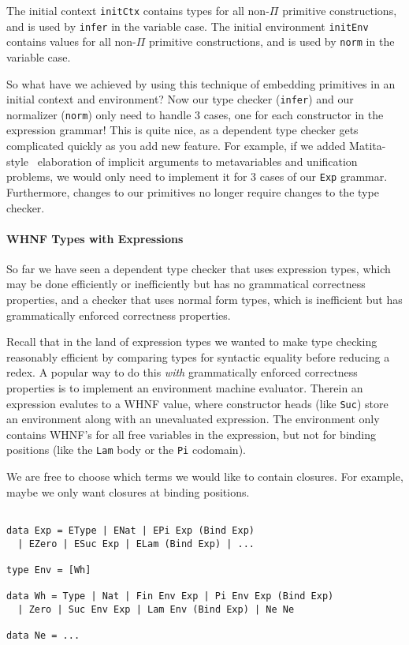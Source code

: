 \documentclass[preprint,authoryear]{sigplanconf}
\begin{document}
The initial context \texttt{initCtx} contains types for all
non-$\Pi$ primitive constructions, and is used by \texttt{infer} in the
variable case.
The initial environment \texttt{initEnv} contains values for all
non-$\Pi$ primitive constructions, and is used by \texttt{norm} in the
variable case.

So what have we achieved by using this technique of embedding primitives
in an initial context and environment? Now our type checker
(\texttt{infer}) and our normalizer (\texttt{norm}) only need to
handle 3 cases, one for each constructor in the expression grammar!
This is quite nice, as a dependent type checker gets complicated
quickly as you add new feature. For example, if we added
Matita-style~\cite{TODO} elaboration of implicit arguments to
metavariables and unification problems, we would only need to
implement it for 3 cases of our \texttt{Exp} grammar.
Furthermore, changes to our primitives no longer require changes to
the type checker.

\paragraph{WHNF Types with Expressions}

So far we have seen a dependent type checker that uses
expression types, which may be done efficiently or inefficiently but
has no grammatical correctness properties, and a checker that uses
normal form types, which is inefficient but has grammatically enforced
correctness properties.

Recall that in the land of expression types we wanted to
make type checking reasonably efficient by
comparing types for syntactic equality before reducing a redex.
A popular way to do this {\it with} grammatically enforced correctness
properties is to implement an environment machine evaluator. Therein
an expression evalutes to a WHNF value, where constructor heads
(like \texttt{Suc}) store an environment along with an unevaluated
expression. The environment only contains WHNF's for all free
variables in the expression, but not for binding positions (like the
\texttt{Lam} body or the \texttt{Pi} codomain).

We are free to choose which terms we would like to contain closures.
For example, maybe we only want closures at binding positions. 

\begin{verbatim}

data Exp = EType | ENat | EPi Exp (Bind Exp)
  | EZero | ESuc Exp | ELam (Bind Exp) | ...

type Env = [Wh]

data Wh = Type | Nat | Fin Env Exp | Pi Env Exp (Bind Exp)
  | Zero | Suc Env Exp | Lam Env (Bind Exp) | Ne Ne

data Ne = ...
\end{verbatim}
\end{document}
